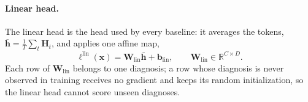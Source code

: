 \paragraph{Linear head.}
The linear head is the head used by every baseline: it averages the tokens, $\bar{\mathbf{h}}=\frac1T\sum_{t}\mathbf{H}_t$, and applies one affine map,
\begin{equation}
\boldsymbol{\ell}^{\mathrm{lin}}(\mathbf{x})=\mathbf{W}_{\mathrm{lin}}\bar{\mathbf{h}}+\mathbf{b}_{\mathrm{lin}},\qquad \mathbf{W}_{\mathrm{lin}}\in\mathbb{R}^{C\times D}.
\label{eq:linear}
\end{equation}
Each row of $\mathbf{W}_{\mathrm{lin}}$ belongs to one diagnosis; a row whose diagnosis is never observed in training receives no gradient and keeps its random initialization, so the linear head cannot score unseen diagnoses.

